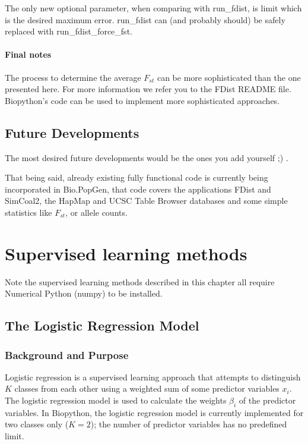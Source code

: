\documentclass{report}
\begin{document}
The only new optional parameter, when comparing with run\_fdist, is limit
which is the desired maximum error. run\_fdist can (and probably should)
be safely replaced with run\_fdist\_force\_fst.

\subsubsection{Final notes}

The process to determine the average $F_{st}$ can be more sophisticated than
the one presented here. For more information we refer you to the FDist
README file. Biopython's code can be used to implement more sophisticated
approaches.

\section{Future Developments}

The most desired future developments would be the ones you add yourself ;) .

That being said, already existing fully functional code is currently being
incorporated in Bio.PopGen, that code covers the applications FDist and
SimCoal2, the HapMap and UCSC Table Browser databases and some simple statistics
like $F_{st}$, or allele counts.

\chapter{Supervised learning methods}

Note the supervised learning methods described in this chapter all require Numerical Python (numpy) to be installed.

\section{The Logistic Regression Model}
\label{sec:LogisticRegression}

\subsection{Background and Purpose}

Logistic regression is a supervised learning approach that attempts to distinguish $K$ classes from each other using a weighted sum of some predictor variables $x_i$. The logistic regression model is used to calculate the weights $\beta_i$ of the predictor variables. In Biopython, the logistic regression model is currently implemented for two classes only ($K = 2$); the number of predictor variables has no predefined limit.
\end{document}
